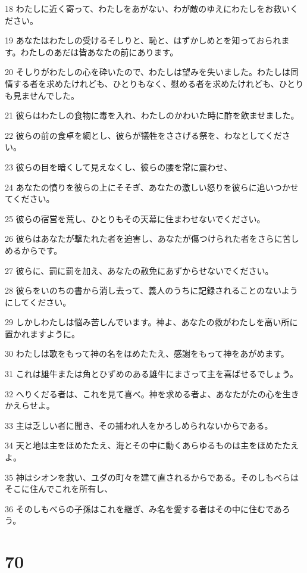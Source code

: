 \par 18 わたしに近く寄って、わたしをあがない、わが敵のゆえにわたしをお救いください。
\par 19 あなたはわたしの受けるそしりと、恥と、はずかしめとを知っておられます。わたしのあだは皆あなたの前にあります。
\par 20 そしりがわたしの心を砕いたので、わたしは望みを失いました。わたしは同情する者を求めたけれども、ひとりもなく、慰める者を求めたけれども、ひとりも見ませんでした。
\par 21 彼らはわたしの食物に毒を入れ、わたしのかわいた時に酢を飲ませました。
\par 22 彼らの前の食卓を網とし、彼らが犠牲をささげる祭を、わなとしてください。
\par 23 彼らの目を暗くして見えなくし、彼らの腰を常に震わせ、
\par 24 あなたの憤りを彼らの上にそそぎ、あなたの激しい怒りを彼らに追いつかせてください。
\par 25 彼らの宿営を荒し、ひとりもその天幕に住まわせないでください。
\par 26 彼らはあなたが撃たれた者を迫害し、あなたが傷つけられた者をさらに苦しめるからです。
\par 27 彼らに、罰に罰を加え、あなたの赦免にあずからせないでください。
\par 28 彼らをいのちの書から消し去って、義人のうちに記録されることのないようにしてください。
\par 29 しかしわたしは悩み苦しんでいます。神よ、あなたの救がわたしを高い所に置かれますように。
\par 30 わたしは歌をもって神の名をほめたたえ、感謝をもって神をあがめます。
\par 31 これは雄牛または角とひずめのある雄牛にまさって主を喜ばせるでしょう。
\par 32 へりくだる者は、これを見て喜べ。神を求める者よ、あなたがたの心を生きかえらせよ。
\par 33 主は乏しい者に聞き、その捕われ人をかろしめられないからである。
\par 34 天と地は主をほめたたえ、海とその中に動くあらゆるものは主をほめたたえよ。
\par 35 神はシオンを救い、ユダの町々を建て直されるからである。そのしもべらはそこに住んでこれを所有し、
\par 36 そのしもべらの子孫はこれを継ぎ、み名を愛する者はその中に住むであろう。

\chapter{70}

